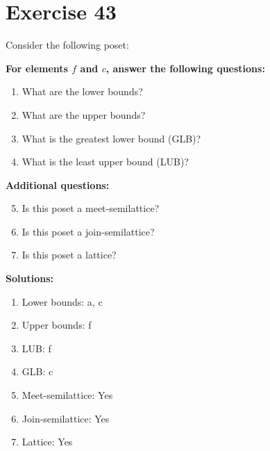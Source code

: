 \documentclass{article}
\begin{document}
\section*{Exercise 43}
Consider the following poset:
\begin{center}
\end{center}

    \textbf{For elements $f$ and $c$, answer the following questions:}
\begin{enumerate}
    \item What are the lower bounds?
    \item What are the upper bounds?
    \item What is the greatest lower bound (GLB)?
    \item What is the least upper bound (LUB)?
\end{enumerate}
    \hspace*{3ex} \textbf{Additional questions:}
\begin{enumerate}
    \setcounter{enumi}{4}
    \item Is this poset a meet-semilattice?
    \item Is this poset a join-semilattice?
    \item Is this poset a lattice?
\end{enumerate}

\textbf{Solutions:}
\begin{enumerate}
    \item Lower bounds: {a, c}
    \item Upper bounds: {f}
    \item LUB: f
    \item GLB: c
    \item Meet-semilattice: Yes
    \item Join-semilattice: Yes
    \item Lattice: Yes
\end{enumerate}
\newpage
\end{document}
